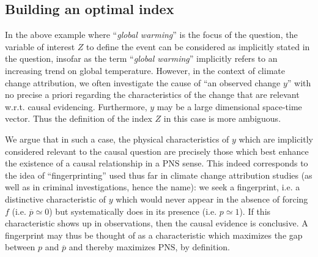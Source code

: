 \documentclass[12pt]{article}
\newcommand{\PNS}{\textrm{PNS}}
\begin{document}
\subsection{Building an optimal index}

In the above example where ``\textit{global warming}'' is the focus of the question, the variable of interest $Z$ to define the event can be considered as implicitly stated in the question, insofar as the term ``\textit{global warming}'' implicitly refers to an increasing trend on global temperature. However, in the context of climate change attribution, we often investigate the cause of ``an observed change $y$'' with no precise a priori regarding the characteristics of the change that are relevant w.r.t. causal evidencing. Furthermore, $y$ may be a large dimensional space-time vector. Thus the definition of the index $Z$ in this case is more ambiguous. 

We argue that in such a case, the physical characteristics of $y$ which are implicitly considered relevant to the causal question are precisely those which best enhance the existence of a causal relationship in a $\PNS$ sense. This indeed  corresponds to the idea of ``fingerprinting'' used thus far in climate change attribution studies (as well as in criminal investigations, hence the name): we seek a fingerprint, i.e. a distinctive characteristic of $y$ which would never appear in the absence of forcing $f$ (i.e. $\overline{p}\simeq 0$) but systematically does in its presence (i.e. $p\simeq 1$). If this characteristic shows up in observations, then the causal evidence is conclusive. %
A fingerprint may thus be thought of as a characteristic which maximizes the gap between $p$ and $\overline{p}$ and thereby maximizes $\PNS$, by definition. %
\end{document}
